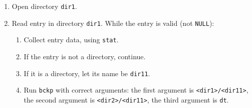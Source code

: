 \documentclass{sope}
\begin{document}
\begin{enumerate}[label=3.\arabic*]
    \item Open directory \texttt{dir1}.
    \item Read entry in directory \texttt{dir1}. While the entry is valid (not \texttt{NULL}):
    \begin{enumerate}[label*=.\arabic*]
        \item Collect entry data, using \texttt{stat}.
        \item If the entry is not a directory, continue.
        \item If it is a directory, let its name be \texttt{dir11}.
        \item Run \texttt{bckp} with correct arguments: the first argument is \texttt{<dir1>/<dir11>}, the second argument is \texttt{<dir2>/<dir11>}, the third argument is \texttt{dt}.
    \end{enumerate}
\end{enumerate}

\newpage
{}


\end{document}
